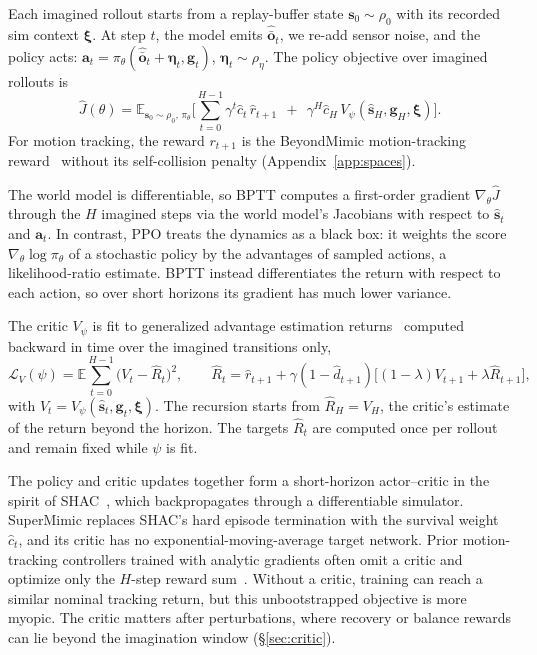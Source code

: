 Each imagined rollout starts from a replay-buffer state $\bm{s}_0\sim\rho_0$ with its recorded sim context $\bm{\xi}$. At step $t$, the model emits $\hat{\bar{\bm{o}}}_t$, we re-add sensor noise, and the policy acts:
$\bm{a}_t=\pi_\theta(\hat{\bar{\bm{o}}}_t+\bm{\eta}_t,\bm{g}_t)$, $\bm{\eta}_t\sim\rho_\eta$.
The policy objective over imagined rollouts is
\begin{equation}
\label{eq:policy-obj}
  \hat{J}(\theta) = \mathbb{E}_{\bm{s}_0 \sim \rho_0,\, \pi_\theta} \Big[ \sum_{t=0}^{H-1} \gamma^t \hat{c}_t\, \hat{r}_{t+1} ~~+~~ \gamma^H \hat{c}_H\, V_\psi(\hat{\bm{s}}_H, \bm{g}_H, \bm{\xi}) \Big].
\end{equation}
For motion tracking, the reward $r_{t+1}$ is the BeyondMimic motion-tracking reward~\citep{liao2025beyondmimic} without its self-collision penalty (Appendix~\ref{app:spaces}).

The world model is differentiable, so BPTT computes a first-order gradient $\nabla_\theta\hat{J}$ through the $H$ imagined steps via the world model's Jacobians with respect to $\hat{\bm{s}}_t$ and $\bm{a}_t$. In contrast, PPO treats the dynamics as a black box: it weights the score $\nabla_\theta\log\pi_\theta$ of a stochastic policy by the advantages of sampled actions, a likelihood-ratio estimate. BPTT instead differentiates the return with respect to each action, so over short horizons its gradient has much lower variance.

The critic $V_\psi$ is fit to generalized advantage estimation returns~\citep{schulman2015high} computed backward in time over the imagined transitions only,
\begin{equation}
\label{eq:critic}
  \mathcal{L}_V(\psi) = \mathbb{E} \sum_{t=0}^{H-1} \big( V_t - \hat{R}_t \big)^2, \qquad
  \hat{R}_t = \hat{r}_{t+1} + \gamma (1-\hat{d}_{t+1}) \big[ (1-\lambda) V_{t+1} + \lambda \hat{R}_{t+1} \big],
\end{equation}
with $V_t = V_\psi(\hat{\bm{s}}_t, \bm{g}_t, \bm{\xi})$. The recursion starts from $\hat{R}_H = V_H$, the critic's estimate of the return beyond the horizon. The targets $\hat{R}_t$ are computed once per rollout and remain fixed while $\psi$ is fit.

The policy and critic updates together form a short-horizon actor--critic in the spirit of SHAC~\citep{xu2022accelerated}, which backpropagates through a differentiable simulator. SuperMimic replaces SHAC's hard episode termination with the survival weight $\hat{c}_t$, and its critic has no exponential-moving-average target network. Prior motion-tracking controllers trained with analytic gradients often omit a critic and optimize only the $H$-step reward sum~\citep{fussell2021supertrack, yao2022controlvae}. Without a critic, training can reach a similar nominal tracking return, but this unbootstrapped objective is more myopic. The critic matters after perturbations, where recovery or balance rewards can lie beyond the imagination window (\S\ref{sec:critic}).
